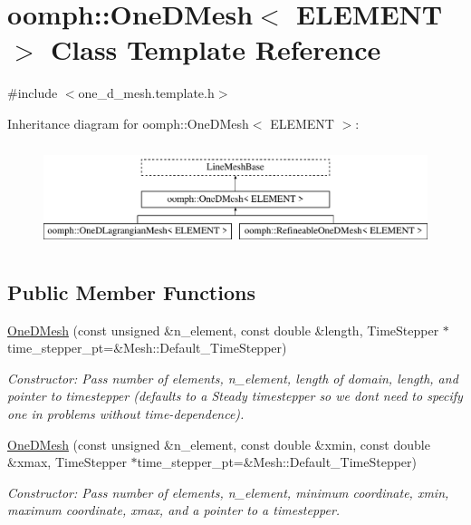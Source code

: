 \hypertarget{classoomph_1_1OneDMesh}{}\section{oomph\+:\+:One\+D\+Mesh$<$ E\+L\+E\+M\+E\+NT $>$ Class Template Reference}
\label{classoomph_1_1OneDMesh}


{\ttfamily \#include $<$one\+\_\+d\+\_\+mesh.\+template.\+h$>$}

Inheritance diagram for oomph\+:\+:One\+D\+Mesh$<$ E\+L\+E\+M\+E\+NT $>$\+:\begin{figure}[H]
\begin{center}
\leavevmode
\includegraphics[height=3.000000cm]{classoomph_1_1OneDMesh}
\end{center}
\end{figure}
\subsection*{Public Member Functions}
\begin{DoxyCompactItemize}
\item 
\hyperlink{classoomph_1_1OneDMesh_ac6962f5c0184d302544253e3b4407c48}{One\+D\+Mesh} (const unsigned \&n\+\_\+element, const double \&length, Time\+Stepper $\ast$time\+\_\+stepper\+\_\+pt=\&Mesh\+::\+Default\+\_\+\+Time\+Stepper)
\begin{DoxyCompactList}\small\item\em Constructor\+: Pass number of elements, n\+\_\+element, length of domain, length, and pointer to timestepper (defaults to a Steady timestepper so we don\textquotesingle{}t need to specify one in problems without time-\/dependence). \end{DoxyCompactList}\item 
\hyperlink{classoomph_1_1OneDMesh_a1a8b9e65226f10dfbb48fe2362e83014}{One\+D\+Mesh} (const unsigned \&n\+\_\+element, const double \&xmin, const double \&xmax, Time\+Stepper $\ast$time\+\_\+stepper\+\_\+pt=\&Mesh\+::\+Default\+\_\+\+Time\+Stepper)
\begin{DoxyCompactList}\small\item\em Constructor\+: Pass number of elements, n\+\_\+element, minimum coordinate, xmin, maximum coordinate, xmax, and a pointer to a timestepper. \end{DoxyCompactList}\end{DoxyCompactItemize}
